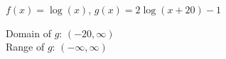 {$f(x) = \log(x)$, $g(x) = 2\log(x+20) -1$  }
{Domain of $g$: $(-20, \infty)$\\
 Range of $g$:  $(-\infty, \infty)$\\

\begin{center}
\end{center}}

